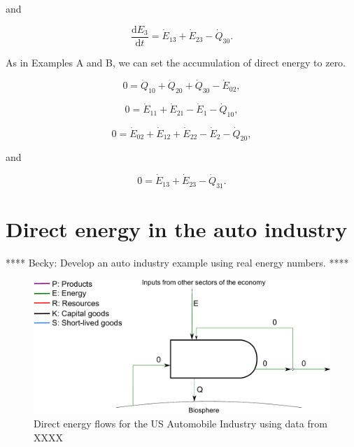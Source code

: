 \noindent and

\begin{equation} \label{eq:C-CV_E_dot_3_simp}
	\frac{\mathrm{d}E_{3}}{\mathrm{d}t} 
	= \dot{E}_{13}
	+ \dot{E}_{23} 
	- \dot{Q}_{30}.
\end{equation}

As in Examples A and B, we can set the accumulation of direct energy to zero.

\begin{equation} \label{eq:C-CV_E_dot_0_SS}
	0
	= \dot{Q}_{10} 
	+ \dot{Q}_{20} 
	+ \dot{Q}_{30} 
	- \dot{E}_{02},
\end{equation}

\begin{equation} \label{eq:C-CV_E_dot_1_SS}
	0
	= \dot{E}_{11}
	+ \dot{E}_{21}
	- \dot{E}_{1}
	- \dot{Q}_{10},
\end{equation}

\begin{equation} \label{eq:C-CV_E_dot_2_SS}
	0
	= \dot{E}_{02} 
	+ \dot{E}_{12}
	+ \dot{E}_{22} 
	- \dot{E}_{2} 
	- \dot{Q}_{20},
\end{equation}

\noindent and 

\begin{equation} \label{eq:C-CV_E_dot_3_SS}
	0
	= \dot{E}_{13}
	+ \dot{E}_{23} 
	- \dot{Q}_{31}.
\end{equation}


\section{Direct energy in the auto industry}
\label{sec:energy_auto}

**** Becky: Develop an auto industry example using real energy numbers. ****

\begin{figure}[h!]
\centering
\includegraphics[width=0.8\linewidth]{Part_2/Chapter_Energy/images/PERKS_basic_unit_energy_auto_ind.pdf}
\caption{Direct energy flows for the US Automobile Industry using data from XXXX}
\label{fig:PERKS_energy_auto}
\end{figure}


